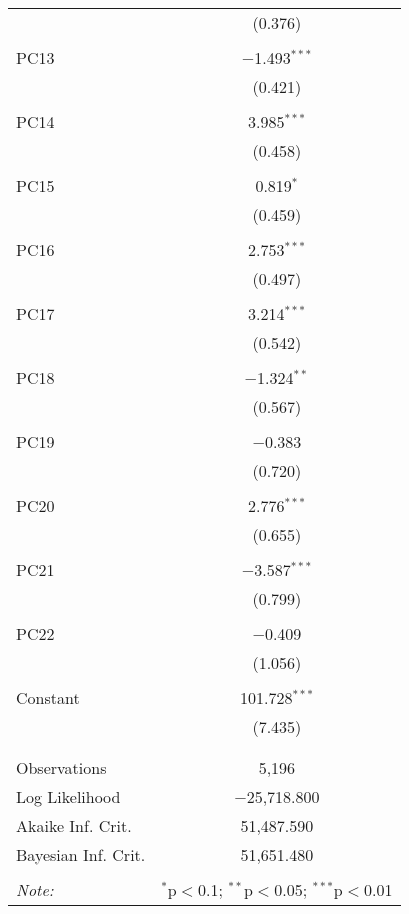 \begin{table}[!htbp]
\begin{tabular}{@{\extracolsep{5pt}}lc}
  & (0.376) \\ 
  & \\ 
 PC13 & $-$1.493$^{***}$ \\ 
  & (0.421) \\ 
  & \\ 
 PC14 & 3.985$^{***}$ \\ 
  & (0.458) \\ 
  & \\ 
 PC15 & 0.819$^{*}$ \\ 
  & (0.459) \\ 
  & \\ 
 PC16 & 2.753$^{***}$ \\ 
  & (0.497) \\ 
  & \\ 
 PC17 & 3.214$^{***}$ \\ 
  & (0.542) \\ 
  & \\ 
 PC18 & $-$1.324$^{**}$ \\ 
  & (0.567) \\ 
  & \\ 
 PC19 & $-$0.383 \\ 
  & (0.720) \\ 
  & \\ 
 PC20 & 2.776$^{***}$ \\ 
  & (0.655) \\ 
  & \\ 
 PC21 & $-$3.587$^{***}$ \\ 
  & (0.799) \\ 
  & \\ 
 PC22 & $-$0.409 \\ 
  & (1.056) \\ 
  & \\ 
 Constant & 101.728$^{***}$ \\ 
  & (7.435) \\ 
  & \\ 
\hline \\[-1.8ex] 
Observations & 5,196 \\ 
Log Likelihood & $-$25,718.800 \\ 
Akaike Inf. Crit. & 51,487.590 \\ 
Bayesian Inf. Crit. & 51,651.480 \\ 
\hline 
\hline \\[-1.8ex] 
\textit{Note:}  & \multicolumn{1}{r}{$^{*}$p$<$0.1; $^{**}$p$<$0.05; $^{***}$p$<$0.01} \\ 
\end{tabular} 
\end{table} 
